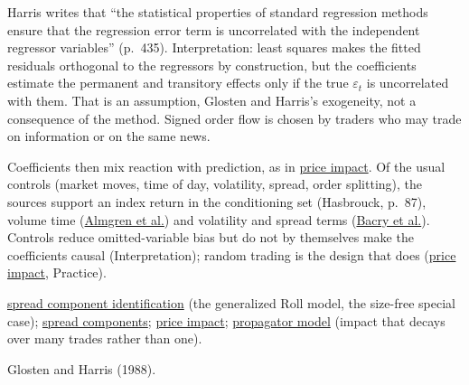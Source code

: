 \begin{qfmethod}
 Harris writes that ``the statistical properties of standard regression methods ensure that the regression error term is uncorrelated with the independent regressor variables'' (p.~435). Interpretation: least squares makes the fitted residuals orthogonal to the regressors by construction, but the coefficients estimate the permanent and transitory effects only if the true $\varepsilon_t$ is uncorrelated with them. That is an assumption, Glosten and Harris's exogeneity, not a consequence of the method. Signed order flow is chosen by traders who may trade on information or on the same news.

Coefficients then mix reaction with prediction, as in \hyperref[def:price-impact]{price impact}. Of the usual controls (market moves, time of day, volatility, spread, order splitting), the sources support an index return in the conditioning set (Hasbrouck, p.~87), volume time (\hyperref[meth:almgren-impact-estimation]{Almgren et al.}) and volatility and spread terms (\hyperref[ev:intraday-impact-profile]{Bacry et al.}). Controls reduce omitted-variable bias but do not by themselves make the coefficients causal (Interpretation); random trading is the design that does (\hyperref[def:price-impact]{price impact}, Practice).

 \hyperref[res:spread-component-identification]{spread component identification} (the generalized Roll model, the size-free special case); \hyperref[res:adverse-selection-spread-component]{spread components}; \hyperref[def:price-impact]{price impact}; \hyperref[mod:propagator]{propagator model} (impact that decays over many trades rather than one).

 Glosten and Harris (1988).

\end{qfmethod}
